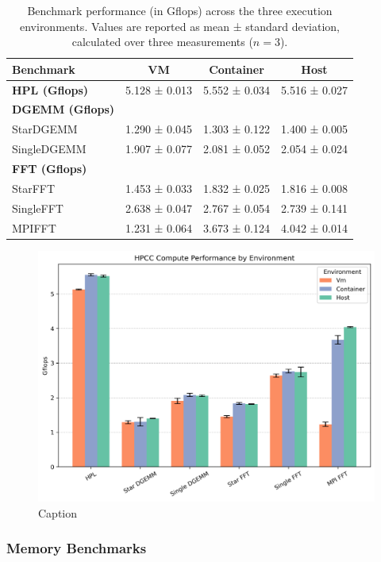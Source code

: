 \begin{table}[htbp]
\centering

\renewcommand{\arraystretch}{1.2}
\begin{tabular}{lccc}
\toprule
\textbf{Benchmark} & \textbf{VM} & \textbf{Container} & \textbf{Host} \\
\midrule
\textbf{HPL (Gflops)} & 5.128 ± 0.013 & 5.552 ± 0.034 & 5.516 ± 0.027 \\
\midrule
\textbf{DGEMM (Gflops)} & & & \\
StarDGEMM     & 1.290 ± 0.045 & 1.303 ± 0.122 & 1.400 ± 0.005 \\
SingleDGEMM   & 1.907 ± 0.077 & 2.081 ± 0.052 & 2.054 ± 0.024 \\
\midrule
\textbf{FFT (Gflops)} & & & \\
StarFFT      & 1.453 ± 0.033 & 1.832 ± 0.025 & 1.816 ± 0.008 \\
SingleFFT    & 2.638 ± 0.047 & 2.767 ± 0.054 & 2.739 ± 0.141 \\
MPIFFT       & 1.231 ± 0.064 & 3.673 ± 0.124 & 4.042 ± 0.014 \\
\bottomrule
\end{tabular}
\caption{Benchmark performance (in Gflops) across the three execution environments. Values are reported as mean ± standard deviation, calculated over three measurements ($n = 3$).}
\label{tab:benchmark_performance}
\end{table}

\begin{figure}[H]
    \centering
    \includegraphics[width=0.8\linewidth]{assets/hpcc_compute_performance.png}
    \caption{Caption}
    \label{fig:enter-label}
\end{figure}

\subsubsection{Memory Benchmarks}

